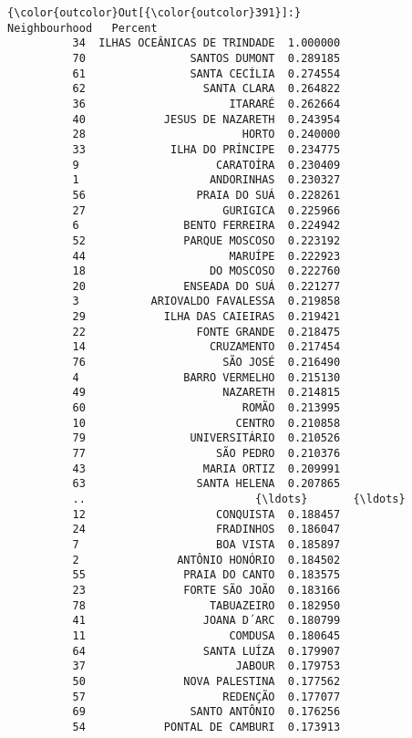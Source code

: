 \documentclass[11pt]{article}
\begin{document}
\begin{Verbatim}[commandchars=\\\{\}]
{\color{outcolor}Out[{\color{outcolor}391}]:}                   Neighbourhood   Percent
          34  ILHAS OCEÂNICAS DE TRINDADE  1.000000
          70                SANTOS DUMONT  0.289185
          61                SANTA CECÍLIA  0.274554
          62                  SANTA CLARA  0.264822
          36                      ITARARÉ  0.262664
          40            JESUS DE NAZARETH  0.243954
          28                        HORTO  0.240000
          33             ILHA DO PRÍNCIPE  0.234775
          9                     CARATOÍRA  0.230409
          1                    ANDORINHAS  0.230327
          56                 PRAIA DO SUÁ  0.228261
          27                     GURIGICA  0.225966
          6                BENTO FERREIRA  0.224942
          52               PARQUE MOSCOSO  0.223192
          44                      MARUÍPE  0.222923
          18                   DO MOSCOSO  0.222760
          20               ENSEADA DO SUÁ  0.221277
          3           ARIOVALDO FAVALESSA  0.219858
          29            ILHA DAS CAIEIRAS  0.219421
          22                 FONTE GRANDE  0.218475
          14                   CRUZAMENTO  0.217454
          76                     SÃO JOSÉ  0.216490
          4                BARRO VERMELHO  0.215130
          49                     NAZARETH  0.214815
          60                        ROMÃO  0.213995
          10                       CENTRO  0.210858
          79                UNIVERSITÁRIO  0.210526
          77                    SÃO PEDRO  0.210376
          43                  MARIA ORTIZ  0.209991
          63                 SANTA HELENA  0.207865
          ..                          {\ldots}       {\ldots}
          12                    CONQUISTA  0.188457
          24                    FRADINHOS  0.186047
          7                     BOA VISTA  0.185897
          2               ANTÔNIO HONÓRIO  0.184502
          55               PRAIA DO CANTO  0.183575
          23               FORTE SÃO JOÃO  0.183166
          78                   TABUAZEIRO  0.182950
          41                  JOANA D´ARC  0.180799
          11                      COMDUSA  0.180645
          64                  SANTA LUÍZA  0.179907
          37                       JABOUR  0.179753
          50               NOVA PALESTINA  0.177562
          57                     REDENÇÃO  0.177077
          69                SANTO ANTÔNIO  0.176256
          54            PONTAL DE CAMBURI  0.173913

\end{Verbatim}
\end{document}
